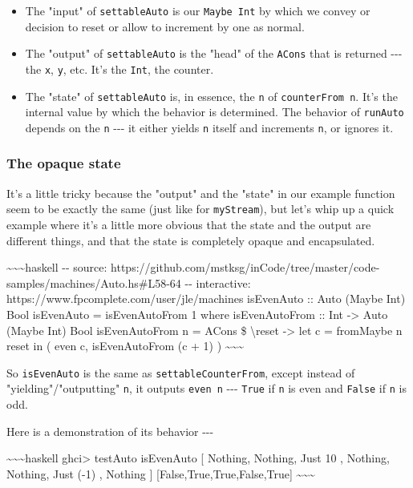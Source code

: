 \documentclass[]{article}
\begin{document}
\begin{itemize}
\tightlist
\item
  The "input" of \texttt{settableAuto} is our \texttt{Maybe\ Int} by which we
  convey or decision to reset or allow to increment by one as normal.
\item
  The "output" of \texttt{settableAuto} is the "head" of the \texttt{ACons} that
  is returned -\/-\/- the \texttt{x}, \texttt{y}, etc. It's the \texttt{Int},
  the counter.
\item
  The "state" of \texttt{settableAuto} is, in essence, the \texttt{n} of
  \texttt{counterFrom\ n}. It's the internal value by which the behavior is
  determined. The behavior of \texttt{runAuto} depends on the \texttt{n} -\/-\/-
  it either yields \texttt{n} itself and increments \texttt{n}, or ignores it.
\end{itemize}

\subsubsection{The opaque state}

It's a little tricky because the "output" and the "state" in our example
function seem to be exactly the same (just like for \texttt{myStream}), but
let's whip up a quick example where it's a little more obvious that the state
and the output are different things, and that the state is completely opaque and
encapsulated.

\textasciitilde{}\textasciitilde{}\textasciitilde{}haskell -\/- source:
https://github.com/mstksg/inCode/tree/master/code-samples/machines/Auto.hs\#L58-64
-\/- interactive: https://www.fpcomplete.com/user/jle/machines isEvenAuto ::
Auto (Maybe Int) Bool isEvenAuto = isEvenAutoFrom 1 where isEvenAutoFrom :: Int
-\textgreater{} Auto (Maybe Int) Bool isEvenAutoFrom n = ACons \$
\textbackslash{}reset -\textgreater{} let c = fromMaybe n reset in ( even c,
isEvenAutoFrom (c + 1) ) \textasciitilde{}\textasciitilde{}\textasciitilde{}

So \texttt{isEvenAuto} is the same as \texttt{settableCounterFrom}, except
instead of "yielding"/"outputting" \texttt{n}, it outputs \texttt{even\ n}
-\/-\/- \texttt{True} if \texttt{n} is even and \texttt{False} if \texttt{n} is
odd.

Here is a demonstration of its behavior -\/-\/-

\textasciitilde{}\textasciitilde{}\textasciitilde{}haskell ghci\textgreater{}
testAuto isEvenAuto {[} Nothing, Nothing, Just 10 , Nothing, Nothing, Just (-1)
, Nothing {]} {[}False,True,True,False,True{]}
\textasciitilde{}\textasciitilde{}\textasciitilde{}
\end{document}
